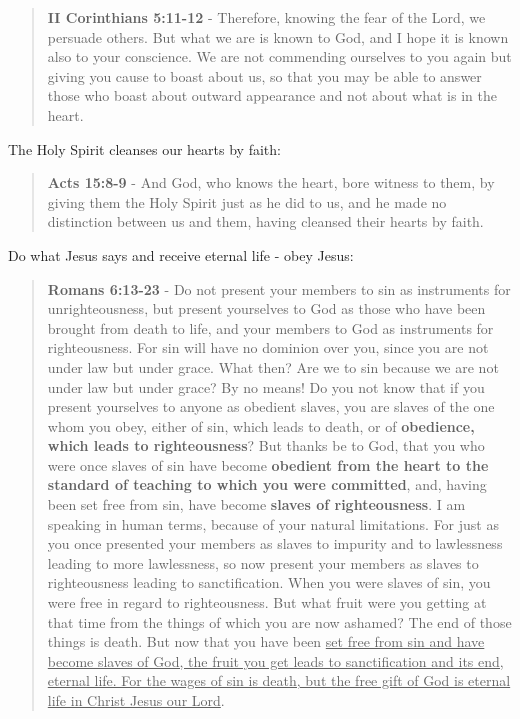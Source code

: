 \documentclass[11pt]{article}
\begin{document}
\begin{quote}
\textbf{II Corinthians 5:11-12} - Therefore, knowing the fear of the Lord, we persuade others. But what we are is known to God, and I hope it is known also to your conscience. We are not commending ourselves to you again but giving you cause to boast about us, so that you may be able to answer those who boast about outward appearance and not about what is in the heart.
\end{quote}

The Holy Spirit cleanses our hearts by faith:

\begin{quote}
\textbf{Acts 15:8-9} - And God, who knows the heart, bore witness to them, by giving them the Holy Spirit just as he did to us, and he made no distinction between us and them, having cleansed their hearts by faith.
\end{quote}

Do what Jesus says and receive eternal life - obey Jesus:

\begin{quote}
\textbf{Romans 6:13-23} - Do not present your members to sin as instruments for unrighteousness, but present yourselves to God as those who have been brought from death to life, and your members to God as instruments for righteousness.  For sin will have no dominion over you, since you are not under law but under grace.  What then? Are we to sin because we are not under law but under grace? By no means!  Do you not know that if you present yourselves to anyone as obedient slaves, you are slaves of the one whom you obey, either of sin, which leads to death, or of \textbf{obedience, which leads to righteousness}?  But thanks be to God, that you who were once slaves of sin have become \textbf{obedient from the heart to the standard of teaching to which you were committed}, and, having been set free from sin, have become \textbf{slaves of righteousness}.  I am speaking in human terms, because of your natural limitations. For just as you once presented your members as slaves to impurity and to lawlessness leading to more lawlessness, so now present your members as slaves to righteousness leading to sanctification.  When you were slaves of sin, you were free in regard to righteousness.  But what fruit were you getting at that time from the things of which you are now ashamed? The end of those things is death.  But now that you have been \uline{set free from sin and have become slaves of God, the fruit you get leads to sanctification and its end, eternal life.  For the wages of sin is death, but the free gift of God is eternal life in Christ Jesus our Lord}.
\end{quote}
\end{document}
